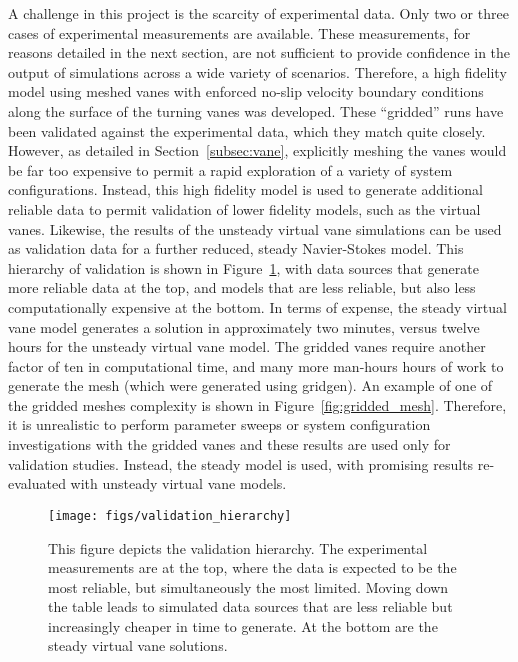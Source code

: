 A challenge in this project is the scarcity of experimental data. Only
two or three cases of experimental measurements are available. These
measurements, for reasons detailed in the next section, are not
sufficient to provide confidence in the output of simulations across a
wide variety  of scenarios. Therefore, a high fidelity model using 
meshed vanes with enforced no-slip velocity boundary conditions along
the surface of the turning vanes was developed. These ``gridded'' runs have
been validated against the experimental data, which they match quite
closely. However, as detailed in Section~\ref{subsec:vane}, 
explicitly meshing the vanes would be far too 
expensive to permit a rapid exploration of a variety of
system configurations. Instead, this high fidelity model is used 
to generate additional reliable data to permit validation of lower
fidelity models, such as the virtual vanes. Likewise, the results of the
unsteady virtual vane simulations can be used as validation data for a
further reduced, steady Navier-Stokes model. This hierarchy of
validation is shown in Figure~\ref{fig:val_hier}, with data sources that
generate more reliable data at the top, and models that are less
reliable, but also less computationally expensive at the bottom. In
terms of expense, the steady virtual vane model generates a solution in
approximately two minutes, versus twelve hours for the unsteady virtual
vane model. The gridded vanes require another factor of ten in
computational time, and many more man-hours hours of work to generate
the mesh (which were generated using gridgen). An example of one of the
gridded meshes complexity is shown in Figure~\ref{fig:gridded_mesh}. 
Therefore, it is unrealistic to perform parameter sweeps or
system configuration investigations with the gridded vanes and these
results are used only for validation studies. Instead, the
steady model is used, with promising results re-evaluated with unsteady
virtual vane models. %

%
%
 \begin{figure}[!htb]
   \begin{center}
    \texttt{[image: figs/validation\_hierarchy]}
    \caption{This figure depicts the validation hierarchy. The
    experimental measurements are at the top, where the data is expected
    to be the most reliable, but simultaneously the most
    limited. Moving down the table leads to simulated data sources that
    are less reliable but increasingly cheaper in time to generate. At
    the bottom are the steady virtual vane solutions.} 
    \label{fig:val_hier}
   \end{center}
 \end{figure}

